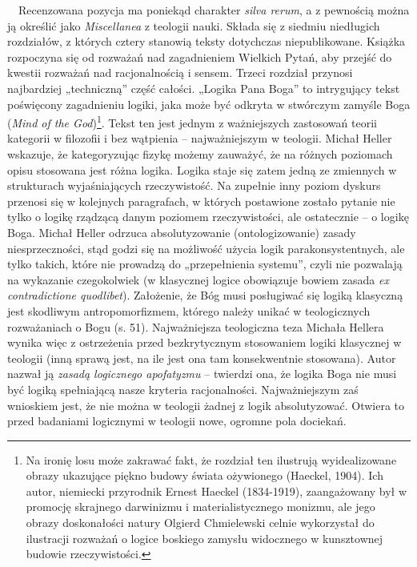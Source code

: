 \documentclass[a4paper]{article}
\newcommand\textstyleDomylnaczcionkaakapitu[1]{#1}
\begin{document}
\ \ Recenzowana pozycja ma poniekąd charakter \textstyleDomylnaczcionkaakapitu{\textit{silva rerum}}, a z pewnością
można ją określić jako \textstyleDomylnaczcionkaakapitu{\textit{Miscellanea}} z teologii nauki. Składa się z siedmiu
niedługich rozdziałów, z których cztery stanowią teksty dotychczas niepublikowane. Książka rozpoczyna się od rozważań
nad zagadnieniem Wielkich Pytań, aby przejść do kwestii rozważań nad racjonalnością i sensem. Trzeci rozdział przynosi
najbardziej „techniczną” część całości. „Logika Pana Boga” to intrygujący tekst poświęcony zagadnieniu logiki, jaka
może być odkryta w stwórczym zamyśle Boga (\textstyleDomylnaczcionkaakapitu{\textit{Mind of the God}})\footnote{Na
ironię losu może zakrawać fakt, że rozdział ten ilustrują wyidealizowane obrazy ukazujące piękno budowy świata
ożywionego (Haeckel, 1904). Ich autor, niemiecki przyrodnik Ernest Haeckel (1834-1919), zaangażowany był w promocję
skrajnego darwinizmu i materialistycznego monizmu, ale jego obrazy doskonałości natury Olgierd Chmielewski celnie
wykorzystał do ilustracji rozważań o logice boskiego zamysłu widocznego w kunsztownej budowie rzeczywistości.}. Tekst
ten jest jednym z ważniejszych zastosowań teorii kategorii w filozofii i bez wątpienia – najważniejszym w teologii.
Michał Heller wskazuje, że kategoryzując fizykę możemy zauważyć, że na różnych poziomach opisu stosowana jest różna
logika. Logika staje się zatem jedną ze zmiennych w strukturach wyjaśniających rzeczywistość. Na zupełnie inny poziom
dyskurs przenosi się w kolejnych paragrafach, w których postawione zostało pytanie nie tylko o logikę rządzącą danym
poziomem rzeczywistości, ale ostatecznie – o logikę Boga. Michał Heller odrzuca absolutyzowanie (ontologizowanie)
zasady niesprzeczności, stąd godzi się na możliwość użycia logik parakonsystentnych, ale tylko takich, które nie
prowadzą do „przepełnienia systemu”, czyli nie pozwalają na wykazanie czegokolwiek (w klasycznej logice obowiązuje
bowiem zasada \textstyleDomylnaczcionkaakapitu{\textit{ex contradictione quodlibet}}). Założenie, że Bóg musi
posługiwać się logiką klasyczną jest skodliwym antropomorfizmem, którego należy unikać w teologicznych rozważaniach o
Bogu (s. 51). Najważniejsza teologiczna teza Michała Hellera wynika więc z ostrzeżenia przed bezkrytycznym stosowaniem
logiki klasycznej w teologii (inną sprawą jest, na ile jest ona tam konsekwentnie stosowana). Autor nazwał ją
\textstyleDomylnaczcionkaakapitu{\textit{zasadą logicznego apofatyzmu }}– twierdzi ona, że logika Boga nie musi być
logiką spełniającą nasze kryteria racjonalności. Najważniejszym zaś wnioskiem jest, że nie można w teologii żadnej z
logik absolutyzować. Otwiera to przed badaniami logicznymi w teologii nowe, ogromne pola dociekań.
\end{document}
